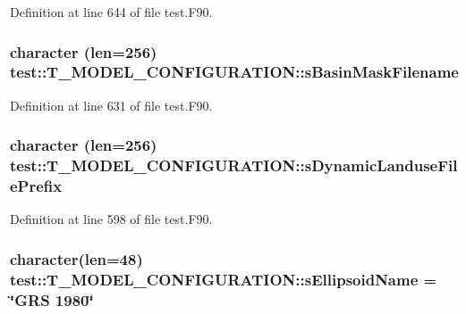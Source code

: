 Definition at line 644 of file test.F90.

\hypertarget{typetest_1_1_t___m_o_d_e_l___c_o_n_f_i_g_u_r_a_t_i_o_n_a407a491984488e1ee33175a364fea0e8}{
\subsubsection[{sBasinMaskFilename}]{\setlength{\rightskip}{0pt plus 5cm}character (len=256) {\bf test::T\_\-MODEL\_\-CONFIGURATION::sBasinMaskFilename}}}
\label{typetest_1_1_t___m_o_d_e_l___c_o_n_f_i_g_u_r_a_t_i_o_n_a407a491984488e1ee33175a364fea0e8}


Definition at line 631 of file test.F90.

\hypertarget{typetest_1_1_t___m_o_d_e_l___c_o_n_f_i_g_u_r_a_t_i_o_n_a7ebda5dc3d2753db4a3fd0b98698b844}{
\subsubsection[{sDynamicLanduseFilePrefix}]{\setlength{\rightskip}{0pt plus 5cm}character (len=256) {\bf test::T\_\-MODEL\_\-CONFIGURATION::sDynamicLanduseFilePrefix}}}
\label{typetest_1_1_t___m_o_d_e_l___c_o_n_f_i_g_u_r_a_t_i_o_n_a7ebda5dc3d2753db4a3fd0b98698b844}


Definition at line 598 of file test.F90.

\hypertarget{typetest_1_1_t___m_o_d_e_l___c_o_n_f_i_g_u_r_a_t_i_o_n_ad1fb9512331f0915e4ea21e797c2f538}{
\subsubsection[{sEllipsoidName}]{\setlength{\rightskip}{0pt plus 5cm}character(len=48) {\bf test::T\_\-MODEL\_\-CONFIGURATION::sEllipsoidName} = \char`\"{}GRS 1980\char`\"{}}}
\label{typetest_1_1_t___m_o_d_e_l___c_o_n_f_i_g_u_r_a_t_i_o_n_ad1fb9512331f0915e4ea21e797c2f538}



